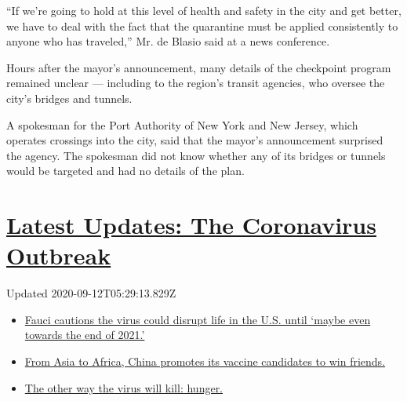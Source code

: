 ``If we're going to hold at this level of health and safety in the city
and get better, we have to deal with the fact that the quarantine must
be applied consistently to anyone who has traveled,'' Mr. de Blasio said
at a news conference.

Hours after the mayor's announcement, many details of the checkpoint
program remained unclear --- including to the region's transit agencies,
who oversee the city's bridges and tunnels.

A spokesman for the Port Authority of New York and New Jersey, which
operates crossings into the city, said that the mayor's announcement
surprised the agency. The spokesman did not know whether any of its
bridges or tunnels would be targeted and had no details of the plan.

\hypertarget{latest-updates-the-coronavirus-outbreak}{%
\section{\texorpdfstring{\href{https://www.nytimes3xbfgragh.onion/2020/09/11/world/covid-19-coronavirus.html?action=click\&pgtype=Article\&state=default\&region=MAIN_CONTENT_1\&context=storylines_live_updates}{Latest
Updates: The Coronavirus
Outbreak}}{Latest Updates: The Coronavirus Outbreak}}\label{latest-updates-the-coronavirus-outbreak}}

Updated 2020-09-12T05:29:13.829Z

\begin{itemize}
\tightlist
\item
  \href{https://www.nytimes3xbfgragh.onion/2020/09/11/world/covid-19-coronavirus.html?action=click\&pgtype=Article\&state=default\&region=MAIN_CONTENT_1\&context=storylines_live_updates\#link-dfb8a16}{Fauci
  cautions the virus could disrupt life in the U.S. until `maybe even
  towards the end of 2021.'}
\item
  \href{https://www.nytimes3xbfgragh.onion/2020/09/11/world/covid-19-coronavirus.html?action=click\&pgtype=Article\&state=default\&region=MAIN_CONTENT_1\&context=storylines_live_updates\#link-7104d154}{From
  Asia to Africa, China promotes its vaccine candidates to win friends.}
\item
  \href{https://www.nytimes3xbfgragh.onion/2020/09/11/world/covid-19-coronavirus.html?action=click\&pgtype=Article\&state=default\&region=MAIN_CONTENT_1\&context=storylines_live_updates\#link-393ad215}{The
  other way the virus will kill: hunger.}
\end{itemize}

